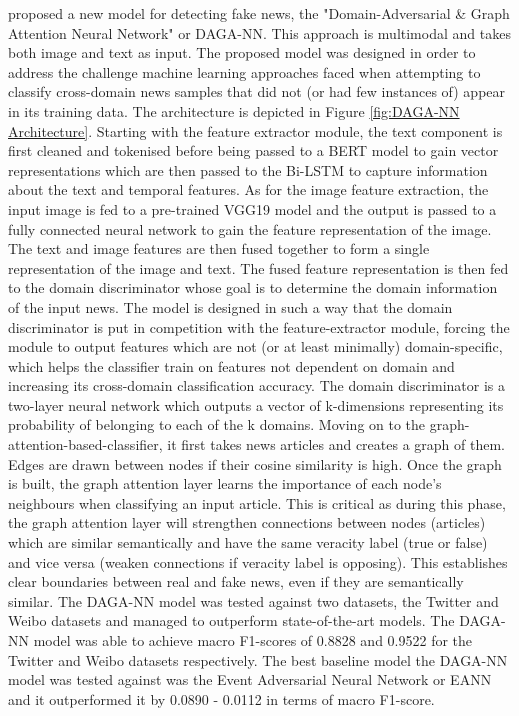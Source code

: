 \documentclass[stu,12pt,floatsintext,donotrepeattitle]{apa7}
\begin{document}

\parencite{graph-attention-multimodal} proposed a new model for detecting fake news, the "Domain-Adversarial \& Graph Attention Neural Network" or DAGA-NN. This approach is multimodal and takes both image and text as input. The proposed model was designed in order to address the challenge machine learning approaches faced when attempting to classify cross-domain news samples that did not (or had few instances of) appear in its training data. The architecture is depicted in Figure \ref{fig:DAGA-NN Architecture}. Starting with the feature extractor module, the text component is first cleaned and tokenised before being passed to a BERT model to gain vector representations which are then passed to the Bi-LSTM to capture information about the text and temporal features. As for the image feature extraction, the input image is fed to a pre-trained VGG19 model and the output is passed to a fully connected neural network to gain the feature representation of the image. The text and image features are then fused together to form a single representation of the image and text. The fused feature representation is then fed to the domain discriminator whose goal is to determine the domain information of the input news. The model is designed in such a way that the domain discriminator is put in competition with the feature-extractor module, forcing the module to output features which are not (or at least minimally) domain-specific, which helps the classifier train on features not dependent on domain and increasing its cross-domain classification accuracy. The domain discriminator is a two-layer neural network which outputs a vector of k-dimensions representing its probability of belonging to each of the k domains. Moving on to the graph-attention-based-classifier, it first takes news articles and creates a graph of them. Edges are drawn between nodes if their cosine similarity is high. Once the graph is built, the graph attention layer learns the importance of each node's neighbours when classifying an input article. This is critical as during this phase, the graph attention layer will strengthen connections between nodes (articles) which are similar semantically and have the same veracity label (true or false) and vice versa (weaken connections if veracity label is opposing). This establishes clear boundaries between real and fake news, even if they are semantically similar. The DAGA-NN model was tested against two datasets, the Twitter and Weibo datasets and managed to outperform state-of-the-art models. The DAGA-NN model was able to achieve macro F1-scores of 0.8828 and 0.9522 for the Twitter and Weibo datasets respectively. The best baseline model the DAGA-NN model was tested against was the Event Adversarial Neural Network or EANN and it outperformed it by 0.0890 - 0.0112 in terms of macro F1-score. 
\end{document}
